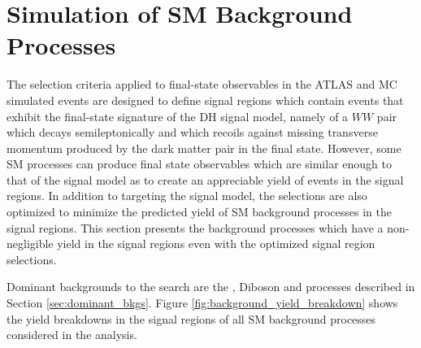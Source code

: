 \section{Simulation of SM Background Processes}
\label{sec:SM_bkg_sim}

The selection criteria applied to final-state observables in the ATLAS and MC simulated events are designed to define signal regions which contain events that exhibit the final-state signature of the DH signal model, namely of a \(WW\) pair which decays semileptonically and which recoils against missing transverse momentum produced by the dark matter pair in the final state. However, some SM processes can produce final state observables which are similar enough to that of the signal model as to create an appreciable yield of events in the signal regions. In addition to targeting the signal model, the selections are also optimized to minimize the predicted yield of SM background processes in the signal regions. This section presents the background processes which have a non-negligible yield in the signal regions even with the optimized signal region selections.

Dominant backgrounds to the search are the \wjets, Diboson and \ttbar processes described in Section \ref{sec:dominant_bkgs}. 
Figure \ref{fig:background_yield_breakdown} shows the yield breakdowns in the signal regions of all SM background processes considered in the analysis.

